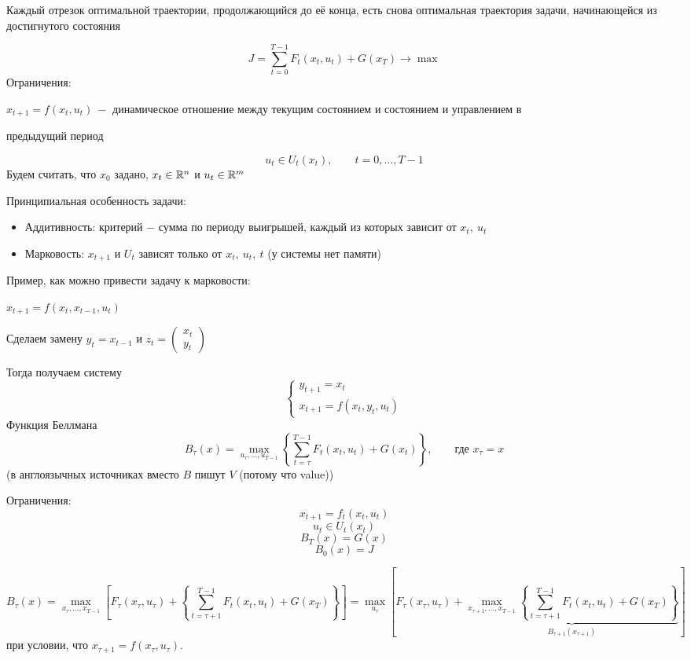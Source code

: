 \documentclass[a4paper,11pt]{article}
\begin{document}
Каждый отрезок оптимальной траектории, продолжающийся до её конца, есть снова оптимальная траектория задачи, начинающейся из достигнутого состояния

\[J = \sum_{t=0}^{T-1}F_t(x_t, u_t) + G(x_T) \to \max\]
Ограничения:

$x_{t+1} = f(x_t, u_t)\ -$ динамическое отношение между текущим состоянием и состоянием и управлением в 

предыдущий период

\[u_t \in U_t(x_t),\qquad t = 0,\dots,T-1\]
Будем считать, что $x_0$ задано, $x_t \in \mathbb{R}^n$ и $u_t \in \mathbb{R}^m$

Принципиальная особенность задачи:
\begin{itemize}
    \item Аддитивность: критерий $-$ сумма по периоду выигрышей, каждый из которых зависит от $x_t,\ u_t$
    \item Марковость: $x_{t+1}$ и $U_t$ зависят только от $x_t,\ u_t,\ t$ (у системы нет памяти)
\end{itemize}
Пример, как можно привести задачу к марковости:

$x_{t+1} = f(x_t, x_{t-1}, u_t)$

Сделаем замену $y_t = x_{t-1}$ и $z_t = \begin{pmatrix}
    x_t\\
    y_t
\end{pmatrix}$

Тогда получаем систему
\[\begin{cases}
    y_{t+1} = x_t\\
    x_{t+1} = f(x_t, y_t, u_t)
\end{cases}\]
Функция Беллмана
\[B_{\tau}(x) = \max_{u_\tau,\dots,u_{T-1}}\left\{\sum_{t=\tau}^{T-1}F_t(x_t,u_t) + G(x_t)\right\},\qquad \text{где } x_{\tau} = x\]
(в англоязычных источниках вместо $B$ пишут $V$ (потому что value))

Ограничения:
\[x_{t+1} = f_t(x_t,u_t)\]
\[u_t \in U_t(x_t)\]
\[B_T(x) = G(x)\]
\[B_0(x) = J\]

\[B_\tau(x) = \max_{x_\tau,\dots,x_{T-1}}\left[F_\tau(x_\tau,u_\tau) + \left\{\sum_{t=\tau+1}^{T-1}F_t(x_t,u_t) + G(x_T)\right\}\right] = \max_{u_\tau}\left[F_\tau(x_\tau,u_\tau) + \underbrace{\max_{x_{\tau+1},\dots,x_{T-1}}\left\{\sum_{t=\tau+1}^{T-1}F_t(x_t,u_t) + G(x_T)\right\}}_{B_{\tau+1}(x_{\tau+1})}\right]\]
при условии, что $x_{\tau+1} = f(x_{\tau},u_{\tau})$.
\end{document}
